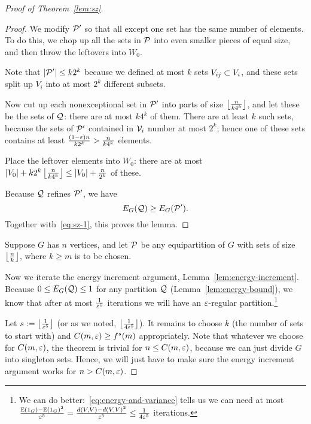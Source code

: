 \begin{proof}[Proof of Theorem~\ref{lem:sz}]
\begin{proof}
 We modify $\cal P'$ so that all except one set has the same number of elements. To do this, we chop up all the sets in $\cal P$ into even smaller pieces of equal size, and then throw the leftovers into $W_0$.

Note that $|\cal P'|\le k2^k$ because we defined at most $k$ sets $V_{ij}\sub V_{i}$, and these sets split up $V_i$ into at most $2^k$ different subsets.

Now cut up each nonexceptional set in $\cal P'$ into parts of size $\ff{n}{k4^k}$, and let these be the sets of $\cal Q$: there are at most $k4^k$ of them. There are at least $k$ such sets, because the sets of $\cal P'$ contained in $\cal V_i$ number at most $2^k$; hence one of these sets contains at least $\fc{(1-\ep)n}{k2^k}>\fc{n}{k4^k}$ elements.  

Place the leftover elements into $W_0$: there are at most $|V_0|+k2^k\ff{n}{k4^k}\le |V_0|+\fc{n}{2^k}$ of these.

Because $\cal Q$ refines $\cal P'$, we have
\[
E_G(\cal Q)\ge E_G(\cal P').
\]
Together with~\eqref{eq:sz-1}, this proves the lemma.
\end{proof}

Suppose $G$ has $n$ vertices, and let $\cal P$ be any equipartition of $G$ with sets of size $\ff{n}{k}$, where $k\ge m$ is to be chosen.

Now we iterate the energy increment argument, Lemma~\ref{lem:energy-increment}. Because $0\le E_G(\cal Q)\le 1$ for any partition $\cal Q$ (Lemma~\ref{lem:energy-bound}), we know that after at most $\rc{\ep^5}$ iterations we will have an $\ep$-regular partition.\footnote{We can do better:~\eqref{eq:energy-and-variance} tells us we can need at most $\fc{\E(1_G)-\E(1_G)^2}{\ep^5}=\fc{d(V,V)-d(V,V)^2}{\ep^5}\le \rc{4\ep^5}$ iterations.}

Let $s:=\ff{1}{\ep^5}$ (or as we noted, $\ff{1}{4\ep^5}$).
It remains to choose $k$ (the number of sets to start with) and $C(m,\ep)\ge f^{s}(m)$ appropriately. Note that whatever we choose for $C(m,\ep)$, the theorem is trivial for $n\le C(m,\ep)$, because we can just divide $G$ into singleton sets. Hence, we will just have to make sure the energy increment argument works for $n>C(m,\ep)$.


\end{proof}
